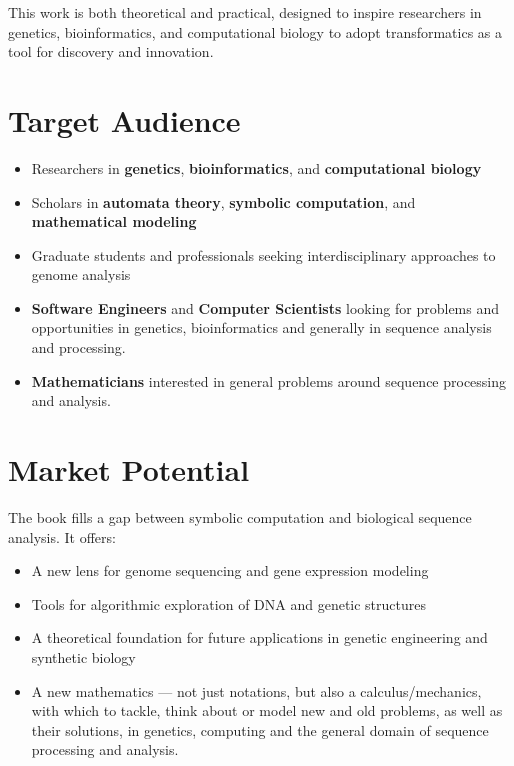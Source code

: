\documentclass[12pt]{article}
\begin{document}
This work is both theoretical and practical, designed to inspire researchers in genetics, bioinformatics, and computational biology to adopt transformatics as a tool for discovery and innovation.

\section{Target Audience}
\begin{itemize}
    \item Researchers in \textbf{genetics}, \textbf{bioinformatics}, and \textbf{computational biology}
    \item Scholars in \textbf{automata theory}, \textbf{symbolic computation}, and \textbf{mathematical modeling}
    \item Graduate students and professionals seeking interdisciplinary approaches to genome analysis
    \item \textbf{Software Engineers} and \textbf{Computer Scientists} looking for problems and opportunities in genetics, bioinformatics and generally in sequence analysis and processing.
    \item \textbf{Mathematicians} interested in general problems around sequence processing and analysis.
\end{itemize}

\section{Market Potential}
The book fills a gap between symbolic computation and biological sequence analysis. It offers:
\begin{itemize}
    \item A new lens for genome sequencing and gene expression modeling
    \item Tools for algorithmic exploration of DNA and genetic structures
    \item A theoretical foundation for future applications in genetic engineering and synthetic biology
    \item A new mathematics --- not just notations, but also a calculus/mechanics, with which to tackle, think about or model new and old problems, as well as their solutions, in genetics, computing and the general domain of sequence processing and analysis.
\end{itemize}
\end{document}
